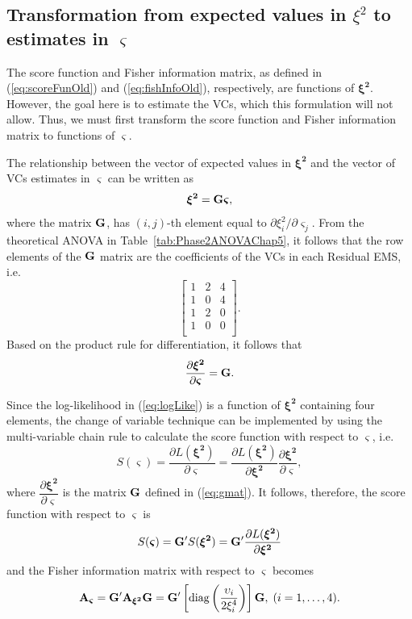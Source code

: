 \subsection{Transformation from expected values in {\boldmath $\xi^2$} to estimates in {\boldmath $\varsigma$}}
The score function and Fisher information matrix, as defined in (\ref{eq:scoreFunOld}) and (\ref{eq:fishInfoOld}), respectively, are functions of $\bm{\xi^2}$. However, the goal here is to estimate the VCs, which this formulation will not allow. Thus, we must first transform the score function and Fisher information matrix to functions of $\bm{\varsigma}$.
 
The relationship between the vector of expected values in $\bm{\xi^2}$ and the vector of VCs estimates in $\bm{\varsigma}$ can be written as 
\[
\bm{\xi^2} = \mathbf{G} \bm{\varsigma},
\]
where the matrix $\mathbf{G}$, has $(i,j)$-th element equal to $\partial \xi_i^2/\partial \varsigma_j$. From the theoretical ANOVA in Table~\ref{tab:Phase2ANOVAChap5}, it follows that the row elements of the $\mathbf{G}$ matrix are the coefficients of the VCs in each Residual EMS, i.e.\
\[\begin{bmatrix}               
1 & 2 & 4\\
1 & 0 & 4\\
1 & 2 & 0\\
1 & 0 & 0\\
\end{bmatrix}.\]
Based on the product rule for differentiation, it follows that 
\begin{equation}\label{eq:gmat}
\dfrac{\partial \bm{\xi^2}}{\partial \bm{\varsigma}} = \mathbf{G}.
\end{equation}
  
Since the log-likelihood in (\ref{eq:logLike}) is a function of $\bm{\xi^2}$ containing four elements, the change of variable technique can be implemented by using the multi-variable chain rule to calculate the score function with respect to $\bm{\varsigma}$, i.e.\ 
\begin{equation}\label{eq:scoreFunLast}
S(\bm{\varsigma}) =\dfrac{\partial L(\bm{\xi^2})}{\partial \bm{\varsigma}} = \dfrac{\partial L(\bm{\xi^2})}{\partial  \bm{\xi^2}} \dfrac{\partial \bm{\xi^2}}{\partial \bm{\varsigma}}, 
\end{equation}
where $ \dfrac{\partial \bm{\xi^2}}{\partial \bm{\varsigma}}$ is the matrix $\mathbf{G}$ defined in (\ref{eq:gmat}). It follows, therefore, the score function with respect to $\bm{\varsigma}$ is
\begin{equation}\label{eq:scoreFunNew}
S(\bm{\varsigma}) = \mathbf{G}' S(\bm{\xi^2})= \mathbf{G}' \dfrac{\partial L(\bm{\xi^2})}{\partial \bm{\xi^2}}
\end{equation}
and the Fisher information matrix with respect to $\bm{\varsigma}$ becomes
\begin{equation}\label{eq:fishInfoNew}
\mathbf{A}_{\bm{\varsigma}} = \mathbf{G}' \mathbf{A}_{\bm{\xi^2}} \mathbf{G} =  \mathbf{G}' \left[\mathrm{diag}\left( \dfrac{\upsilon_i }{2\xi_i^4}\right)\right] \mathbf{G}, \; (i = 1, \dots, 4).
\end{equation}

